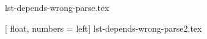 \documentclass{minimal}
\begin{document}
{lst-depends-wrong-parse.tex}


[
    float,
    numbers  = left]
{lst-depends-wrong-parse2.tex}
\end{document}
